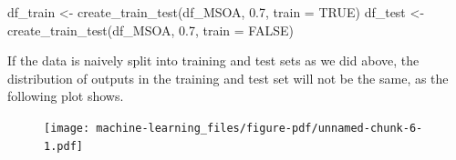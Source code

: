 \documentclass[
  letterpaper,
  DIV=11,
  numbers=noendperiod]{scrreprt}
\newenvironment{Shaded}{\begin{snugshade}}{\end{snugshade}}
\newcommand{\AttributeTok}[1]{\textcolor[rgb]{0.40,0.45,0.13}{#1}}
\newcommand{\ConstantTok}[1]{\textcolor[rgb]{0.56,0.35,0.01}{#1}}
\newcommand{\DecValTok}[1]{\textcolor[rgb]{0.68,0.00,0.00}{#1}}
\newcommand{\FloatTok}[1]{\textcolor[rgb]{0.68,0.00,0.00}{#1}}
\newcommand{\FunctionTok}[1]{\textcolor[rgb]{0.28,0.35,0.67}{#1}}
\newcommand{\NormalTok}[1]{\textcolor[rgb]{0.00,0.23,0.31}{#1}}
\newcommand{\OtherTok}[1]{\textcolor[rgb]{0.00,0.23,0.31}{#1}}
\newcommand{\SpecialCharTok}[1]{\textcolor[rgb]{0.37,0.37,0.37}{#1}}
\newcommand{\StringTok}[1]{\textcolor[rgb]{0.13,0.47,0.30}{#1}}
\begin{document}
\begin{Shaded}
\begin{Highlighting}[]
\NormalTok{df\_train }\OtherTok{\textless{}{-}} \FunctionTok{create\_train\_test}\NormalTok{(df\_MSOA, }\FloatTok{0.7}\NormalTok{, }\AttributeTok{train =} \ConstantTok{TRUE}\NormalTok{)}
\NormalTok{df\_test }\OtherTok{\textless{}{-}} \FunctionTok{create\_train\_test}\NormalTok{(df\_MSOA, }\FloatTok{0.7}\NormalTok{, }\AttributeTok{train =} \ConstantTok{FALSE}\NormalTok{)}
\end{Highlighting}
\end{Shaded}

If the data is naively split into training and test sets as we did
above, the distribution of outputs in the training and test set will not
be the same, as the following plot shows.

\begin{Shaded}
\end{Shaded}

\begin{figure}[H]

{\centering \texttt{[image: machine-learning\_files/figure-pdf/unnamed-chunk-6-1.pdf]}

}

\end{figure}
\end{document}
